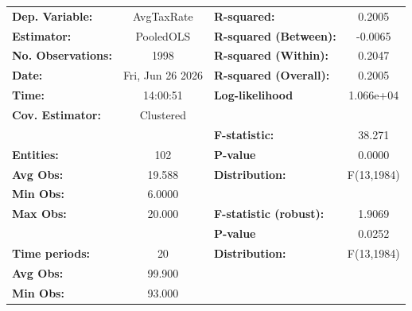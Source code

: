 \begin{center}
\begin{tabular}{lclc}
\toprule
\textbf{Dep. Variable:}                            &     AvgTaxRate     & \textbf{  R-squared:         }   &      0.2005      \\
\textbf{Estimator:}                                &     PooledOLS      & \textbf{  R-squared (Between):}  &     -0.0065      \\
\textbf{No. Observations:}                         &        1998        & \textbf{  R-squared (Within):}   &      0.2047      \\
\textbf{Date:}                                     &  Fri, Jun 26 2026  & \textbf{  R-squared (Overall):}  &      0.2005      \\
\textbf{Time:}                                     &      14:00:51      & \textbf{  Log-likelihood     }   &    1.066e+04     \\
\textbf{Cov. Estimator:}                           &     Clustered      & \textbf{                     }   &                  \\
\textbf{}                                          &                    & \textbf{  F-statistic:       }   &      38.271      \\
\textbf{Entities:}                                 &        102         & \textbf{  P-value            }   &      0.0000      \\
\textbf{Avg Obs:}                                  &       19.588       & \textbf{  Distribution:      }   &    F(13,1984)    \\
\textbf{Min Obs:}                                  &       6.0000       & \textbf{                     }   &                  \\
\textbf{Max Obs:}                                  &       20.000       & \textbf{  F-statistic (robust):} &      1.9069      \\
\textbf{}                                          &                    & \textbf{  P-value            }   &      0.0252      \\
\textbf{Time periods:}                             &         20         & \textbf{  Distribution:      }   &    F(13,1984)    \\
\textbf{Avg Obs:}                                  &       99.900       & \textbf{                     }   &                  \\
\textbf{Min Obs:}                                  &       93.000       & \textbf{                     }   &                  \\

\end{tabular}
\end{center}
